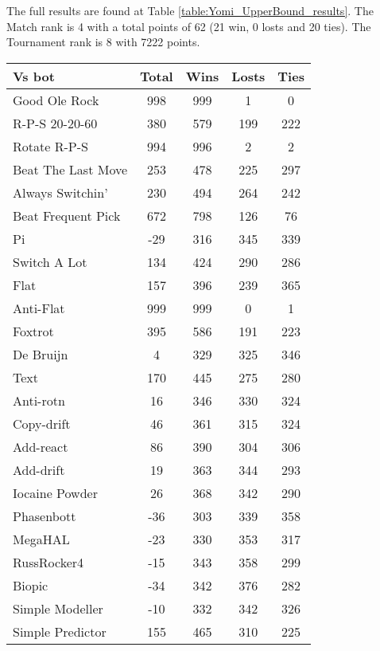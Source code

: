 The full results are found at Table \ref{table:Yomi_UpperBound_results}. The Match rank is 4 with a total points of 62 (21 win, 0 losts and 20 ties). The Tournament rank is 8 with 7222 points.

\begin{table*}
    \caption{Complete Yomi - Upper Bound results}
    \label{table:Yomi_UpperBound_results}
    \centering
    \begin{tabular}{|l|c|c|c|c|}
        \hline
        \textbf{Vs bot} & \textbf{Total} & \textbf{Wins} & \textbf{Losts} & \textbf{Ties} \\ \hline
Good Ole Rock & 998 & 999 & 1 & 0 \\ \hline 
R-P-S 20-20-60 & 380 & 579 & 199 & 222 \\ \hline 
Rotate R-P-S & 994 & 996 & 2 & 2 \\ \hline 
Beat The Last Move & 253 & 478 & 225 & 297 \\ \hline 
Always Switchin' & 230 & 494 & 264 & 242 \\ \hline 
Beat Frequent Pick & 672 & 798 & 126 & 76 \\ \hline 
Pi & -29 & 316 & 345 & 339 \\ \hline 
Switch A Lot & 134 & 424 & 290 & 286 \\ \hline 
Flat & 157 & 396 & 239 & 365 \\ \hline 
Anti-Flat & 999 & 999 & 0 & 1 \\ \hline 
Foxtrot & 395 & 586 & 191 & 223 \\ \hline 
De Bruijn & 4 & 329 & 325 & 346 \\ \hline 
Text & 170 & 445 & 275 & 280 \\ \hline 
Anti-rotn & 16 & 346 & 330 & 324 \\ \hline 
Copy-drift & 46 & 361 & 315 & 324 \\ \hline 
Add-react & 86 & 390 & 304 & 306 \\ \hline 
Add-drift & 19 & 363 & 344 & 293 \\ \hline 
Iocaine Powder & 26 & 368 & 342 & 290 \\ \hline 
Phasenbott & -36 & 303 & 339 & 358 \\ \hline 
MegaHAL & -23 & 330 & 353 & 317 \\ \hline 
RussRocker4 & -15 & 343 & 358 & 299 \\ \hline 
Biopic & -34 & 342 & 376 & 282 \\ \hline 
Simple Modeller & -10 & 332 & 342 & 326 \\ \hline 
Simple Predictor & 155 & 465 & 310 & 225 \\ \hline 

\end{tabular}
\end{table*}
